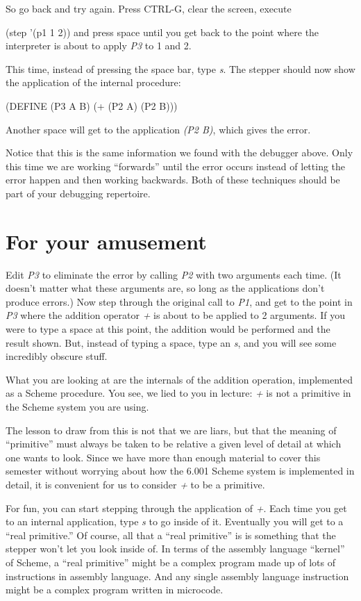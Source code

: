 So go back and try again.  Press CTRL-G, clear the screen,
execute
\beginlisp

(step '(p1 1 2))
\endlisp
and press space until you get back to the point where the
interpreter is about to apply {\it P3} to 1 and 2.

This time, instead of pressing the space bar, type {\it s}.
The stepper should now show the application of the internal procedure:
\beginlisp

(DEFINE (P3 A B) (+ (P2 A) (P2 B)))
\endlisp

Another space will get to the application {\it (P2 B)}, which gives
the error.

Notice that this is the same information we found with the
debugger above.  Only this time we are working ``forwards'' until
the error occurs instead of letting the error happen and then
working backwards.  Both of these techniques should be part of
your debugging repertoire.


\section{For your amusement}

Edit {\it P3} to eliminate the error by calling {\it P2} with two
arguments each time.  (It doesn't matter what these
arguments are, so long as the applications don't produce errors.) 
Now step through the original call to {\it P1}, and get to the point in
{\it P3} where the addition operator {\it +} is about to be applied
to 2 arguments.  If you were to type a space at this point, the
addition would be performed and the result shown.  But, instead
of typing a space, type an {\it s}, and you will see some incredibly
obscure stuff.

What you are looking at are the internals of the addition
operation, implemented as a Scheme procedure.  You see, we lied
to you in lecture: {\it +} is not a primitive in the Scheme system
you are using.

The lesson to draw from this is not that we are liars, but that
the meaning of ``primitive'' must always be taken to be relative
a given level of detail at which one wants to look.  Since we
have more than enough material to cover this semester without
worrying about how the 6.001 Scheme system is implemented in
detail, it is convenient for us to consider {\it +} to be a primitive.

For fun, you can start stepping through the application of {\it +}.
Each time you get to an internal application, type {\it s} to go
inside of it.  Eventually you will get to a ``real primitive.''
Of course, all that a ``real primitive'' is is something that the
stepper won't let you look inside of.  In terms of the assembly
language ``kernel'' of Scheme, a ``real primitive'' might be a
complex program made up of lots of instructions in assembly
language.  And any single assembly language instruction might be
a complex program written in microcode.


